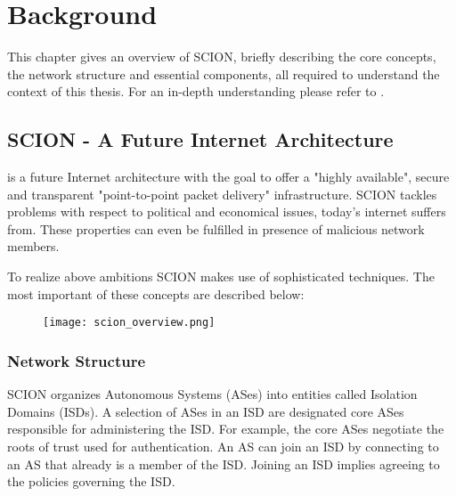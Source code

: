 \chapter{Background}

This chapter gives an overview of SCION, briefly describing the core concepts, the network structure and essential components, all required to understand the context of this thesis. For an in-depth understanding please refer to \cite{scion_book}.

\section{SCION - A Future Internet Architecture}

 is a future Internet architecture with the goal to offer a "highly available", secure and transparent "point-to-point packet delivery" infrastructure. \cite[Page~17]{scion_book} SCION tackles problems with respect to political and economical issues, today's internet suffers from. These properties can even be fulfilled in presence of malicious network members.

To realize above ambitions SCION makes use of sophisticated techniques. The most important of these concepts are described below:

\begin{figure}
	\centering
	\centerline{\texttt{[image: scion\_overview.png]}}
	\label{back:overview}
\end{figure}


\subsection{Network Structure}
\label{back:network_structure}
SCION organizes Autonomous Systems (ASes) into entities called Isolation Domains (ISDs). A selection of ASes in an ISD are designated 
core ASes responsible for administering the ISD. For example, the core ASes  negotiate the roots of trust used for authentication. An AS can join an ISD by connecting to an AS that already is a member of the ISD. Joining an ISD implies agreeing to the policies governing the ISD. \cite[Chapter~2]{scion_book}

